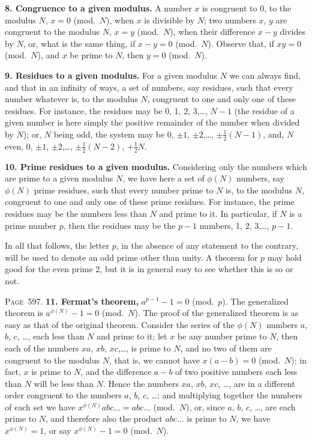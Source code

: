 \documentclass[11pt,a4paper]{book}
\begin{document}
\textbf{8. Congruence to a given modulus.} A number $x$ is congruent to 0, to the modulus $N$, $x=0$ (mod.\ $N$), when $x$ is divisible by $N$; two numbers $x$, $y$ are congruent to the modulus $N$, $x=y$ (mod.\ $N$), when their difference $x-y$ divides by $N$, or, what is the same thing, if $x-y=0$ (mod.\ $N$). Observe that, if $xy=0$ (mod.\ $N$), and $x$ be prime to $N$, then $y=0$ (mod.\ $N$).

\textbf{9. Residues to a given modulus.} For a given modulus $N$ we can always find, and that in an infinity of ways, a set of numbers, say residues, such that every number whatever is, to the modulus $N$, congruent to one and only one of these residues. For instance, the residues may be 0, 1, 2, 3,\ldots, $N-1$ (the residue of a given number is here simply the positive remainder of the number when divided by $N$); or, $N$ being odd, the system may be $0$, $\pm 1$, $\pm 2$,\ldots, $\pm\tfrac12(N-1)$, and, $N$ even, $0$, $\pm 1$, $\pm 2$,\ldots, $\pm\tfrac12(N-2)$, $+\tfrac12N$.

\textbf{10. Prime residues to a given modulus.} Considering only the numbers which are prime to a given modulus $N$, we have here a set of $\phi(N)$ numbers, say $\phi(N)$ prime residues, such that every number prime to $N$ is, to the modulus $N$, congruent to one and only one of these prime residues. For instance, the prime residues may be the numbers less than $N$ and prime to it. In particular, if $N$ is a prime number $p$, then the residues may be the $p-1$ numbers, 1, 2, 3,\ldots, $p-1$.

In all that follows, the letter $p$, in the absence of any statement to the contrary, will be used to denote an odd prime other than unity. A theorem for $p$ may hold good for the even prime 2, but it is in general easy to see whether this is so or not.

\newpage
\noindent\textsc{Page~597.} \textbf{11. Fermat's theorem,} $a^{p-1}-1=0$ (mod.\ $p$). The generalized theorem is $a^{\phi(N)}-1=0$ (mod.\ $N$). The proof of the generalized theorem is as easy as that of the original theorem. Consider the series of the $\phi(N)$ numbers $a$, $b$, $c$, \ldots, each less than $N$ and prime to it; let $x$ be any number prime to $N$, then each of the numbers $xa$, $xb$, $xc$,\ldots, is prime to $N$, and no two of them are congruent to the modulus $N$, that is, we cannot have $x(a-b)=0$ (mod.\ $N$); in fact, $x$ is prime to $N$, and the difference $a-b$ of two positive numbers each less than $N$ will be less than $N$. Hence the numbers $xa$, $xb$, $xc$, \ldots, are in a different order congruent to the numbers $a$, $b$, $c$, \ldots; and multiplying together the numbers of each set we have $x^{\phi(N)}abc\ldots=abc\ldots$ (mod.\ $N$), or, since $a$, $b$, $c$, \ldots, are each prime to $N$, and therefore also the product $abc\ldots$ is prime to $N$, we have $x^{\phi(N)}=1$, or say $x^{\phi(N)}-1=0$ (mod.\ $N$).
\end{document}
